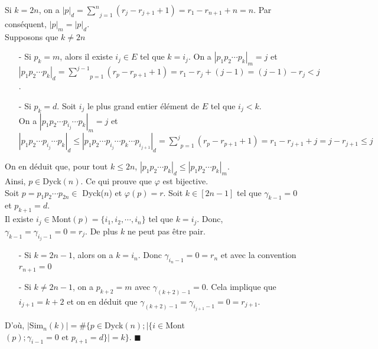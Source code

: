 Si $k=2n$, on a $|p|_{d}=\underset{j=1}{\overset{n}{\sum}}(r_{j}-r_{j+1}+1)=r_{1}-r_{n+1}+n=n$. Par conséquent, $|p|_{m}=|p|_{d}$.\\
Supposons que $k\neq 2n$
\begin{itemize}
	\item [-] Si $p_{k}=m$, alors il existe $i_{j}\in E$ tel que $k=i_{j}$. On a $| p_{1}p_{2}\cdots p_{k} |_{m}=j$ et  \\ $| p_{1}p_{2}\cdots p_{k} |_{d}= \underset{p=1}{\overset{j-1}{\sum}}(r_{p}-r_{p+1}+1)=r_{1}-r_{j}+ (j-1)=(j-1)-r_{j}<j$.
	\item [-] Si $p_{k}=d$. Soit $i_{j}$ le plus grand entier élément de $E$ tel que $i_{j}<k$. \\
	      On a $| p_{1}p_{2}\cdots p_{i_{j}}\cdots p_{k} |_{m}=j$ et\\
	      $| p_{1}p_{2}\cdots p_{i_{j}}\cdots p_{k} |_{d}\leq | p_{1}p_{2}\cdots p_{i_{j}}\cdots p_{k} \cdots p_{i_{j+1}}|_{d}= \underset{p=1}{\overset{j}{\sum}}(r_{p}-r_{p+1}+1)=r_{1}-r_{j+1}+j=j-r_{j+1}\leq j$
\end{itemize}
On en déduit que, pour tout $k \leq 2n$, $| p_{1}p_{2}\cdots p_{k} |_{d} \leq | p_{1}p_{2}\cdots p_{k} |_{m}$.\\ Ainsi, $p\in $\rm{Dyck}$(n)$.
Ce qui prouve que $\varphi$ est bijective.\vspace{10pt}\\
Soit $p=p_{1}p_{2}\cdots p_{2n} \in $ Dyck($n$) et $\varphi(p)=r$.
Soit $k\in [2n-1]$ tel que $\gamma_{k-1}=0$ et $p_{k+1}=d$.\\ Il existe $i_{j}\in $\rm{Mont}$(p)=\{i_{1}, i_{2}, \cdots, i_{n}\}$ tel que $k=i_{j}$. Donc, $\gamma_{k-1}=\gamma_{i_{j}-1}=0=r_{j}$. De plus $k$ ne peut pas être pair.
\begin{itemize}
	\item [-] Si $k=2n-1$, alors on a $k=i_{n}$. Donc $\gamma_{i_{n}-1}=0=r_{n}$ et avec la convention $r_{n+1}=0$
	\item [-] Si $k\neq 2n-1$, on a $p_{k+2}=m$ avec $\gamma_{(k+2)-1}=0$. Cela implique que $i_{j+1} = k+2$ et on en déduit que $\gamma_{(k+2)-1}=\gamma_{i_{j+1}-1}=0=r_{j+1}$.
\end{itemize}
D'où, $|$\rm{Sim}$_{n}(k)| = \# \{p \in $\rm{Dyck}$(n); |\{i \in $\rm{Mont}$(p); \gamma_{i-1}=0 \text{ et } p_{i+1}=d\}|=k\}$. \hspace{10pt}$\blacksquare$

